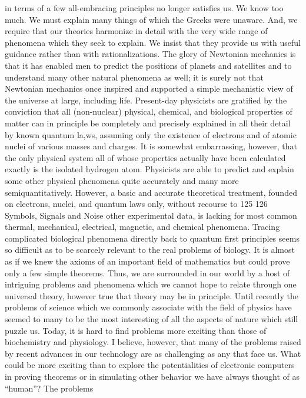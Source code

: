 {{{in terms of a few all-embracing principles no longer satisfies us.
We know too much. We must explain many things of which the
Greeks were unaware. And, we require that our theories harmonize
in detail with the very wide range of phenomena which they seek
to explain. We insist that they provide us with useful guidance
rather than with rationalizations. The glory of Newtonian mechanics
is that it has enabled men to predict the positions of planets
and satellites and to understand many other natural phenomena
as well; it is surely not that Newtonian mechanics once inspired
and supported a simple mechanistic view of the universe at large,
including life.
Present-day physicists are gratified by the conviction that all
(non-nuclear) physical, chemical, and biological properties of matter
can in principle be completely and precisely explained in all
their detail by known quantum la,ws, assuming only the existence
of electrons and of atomic nuclei of various masses and charges.
It is somewhat embarrassing, however, that the only physical system
all of whose properties actually have been calculated exactly
is the isolated hydrogen atom.
Physicists are able to predict and explain some other physical
phenomena quite accurately and many more semiquantitatively.
However, a basic and accurate theoretical treatment, founded on
electrons, nuclei, and quantum laws only, without recourse to
125
126
Symbols, Signals and Noise
other experimental data, is lacking for most common thermal,
mechanical, electrical, magnetic, and chemical phenomena. Tracing
complicated biological phenomena directly back to quantum
first principles seems so difficult as to be scarcely relevant to the
real problems of biology. It is almost as if we knew the axioms of
an important field of mathematics but could prove only a few
simple theorems.
Thus, we are surrounded in our world by a host of intriguing
problems and phenomena which we cannot hope to relate through
one universal theory, however true that theory may be in principle.
Until recently the problems of science which we commonly associate
with the field of physics have seemed to many to be the most
interesting of all the aspects of nature which still puzzle us. Today,
it is hard to find problems more exciting than those of biochemistry
and physiology.
I believe, however, that many of the problems raised by recent
advances in our technology are as challenging as any that face us.
What could be more exciting than to explore the potentialities of
electronic computers in proving theorems or in simulating other
behavior we have always thought of as “human”? The problems
}}}
